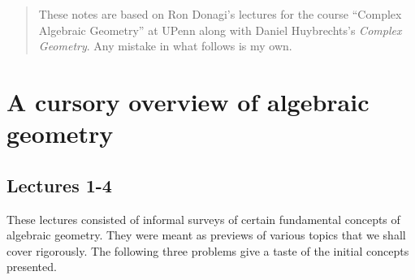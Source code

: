 \documentclass[10pt,letterpaper,cm]{nupset}
\theoremstyle{definition}
\theoremstyle{theorem}
\theoremstyle{remark}
\newcommand{\1}{\mathbb{1}}
\newcommand{\0}{\vec 0}
\begin{document}
\thispagestyle{empty}
\begin{abstract}
These notes are based on Ron Donagi's lectures for the course ``Complex Algebraic Geometry'' at UPenn along with Daniel Huybrechts's \textit{Complex Geometry}. Any mistake in what follows is my own.
\end{abstract}

\tableofcontents
\newpage

\section{A cursory overview of algebraic geometry} 

\subsection{Lectures 1-4}

These lectures consisted of informal surveys of certain fundamental concepts of algebraic geometry. They were meant as previews of various topics that we shall cover rigorously. The following three problems give a taste of the initial concepts presented.

\medskip
\end{document}
